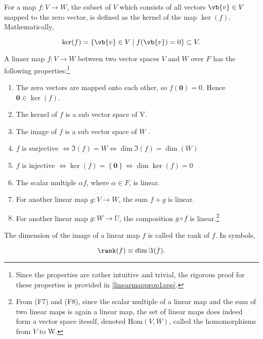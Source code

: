 \documentclass[a4paper,12pt]{report}
\begin{document}
\begin{definition}
For a map \(f: V \rightarrow W\), the subset of \(V\) which consists of all vectors \(\vb{v} \in V\) mapped to the zero vector, is defined as the kernel of the map \(\ker (f)\). Mathematically,
    
\begin{equation}
    \ker (f) = \left\{ \vb{v} \in V \mid f(\vb{v} )=0 \right\} \subset V.
\end{equation}
    
\end{definition}

\begin{lemma} \label{linearmapprop1} 
A linaer map \(f:V \rightarrow W\) between two vector spaces \(V \text { and }  W\) over \(F\) has the following properties:\footnote{Since the properties are rather intuitive and trivial, the rigorous proof for these properties is provided in \cref{linearmapprop1app}.} 

\begin{enumerate}[label=(\(F\)\arabic*)]
    \item The zero vectors are mapped onto each other, so \(f(\boldsymbol{0} ) = 0\). Hence \(\boldsymbol{0} \in \ker (f) \).
    \item The kernel of \(f\) is a sub vector space of V.
    \item The image of \(f\) is a sub vector space of \(W\) .
    \item \(f\) is surjective \(\iff \Im (f) = W \iff \dim \Im (f) = \dim (W)\)
    \item \(f\) is injective \(\iff \ker (f) = \left\{ \boldsymbol{0}  \right\} \iff \dim \ker (f) = 0\)
    \item The scalar multiple \(\alpha f\), where \(\alpha \in  F\), is linear.
    \item For another linear map \(g: V \rightarrow W\), the sum \(f+g\) is linear.
    \item For another linear map \(g: W \rightarrow  U\), the composition \(g \circ f\) is linear.\footnote{From (F7) and (F8), since the scalar multiple of a linear map and the sum of two linear maps is again a linear map, the set of linear maps does indeed form a vector space iteself, denoted \(\text{Hom}(V,W)\), called the homomorphisms from \(V\) to W.}
\end{enumerate}
\end{lemma}

\begin{definition} 
The dimension of the image of a linear map \(f\) is called the rank of \(f\). In symbols,

\begin{equation}
    \rank (f) \equiv \dim \Im (f).
\end{equation}
    
\end{definition}
\end{document}
